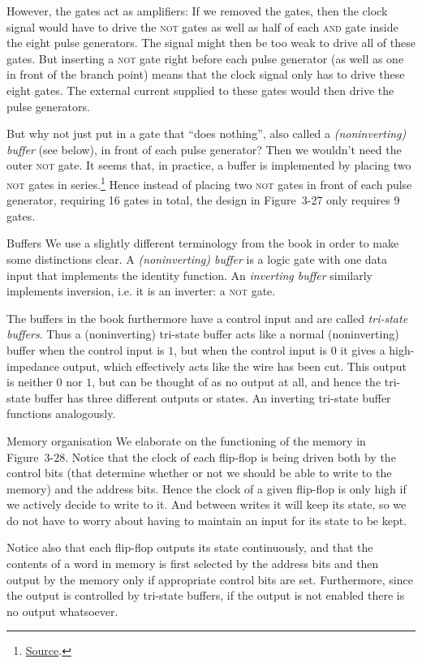 \documentclass[article, a4paper, 11pt, oneside]{memoir}
\numberwithin{equation}{chapter}
\newcommand{\gate}{\textsc}
\newcommand{\gateNOT}{\gate{not}}
\newcommand{\gateAND}{\gate{and}}
\begin{document}
\begin{notelist}
However, the gates act as amplifiers: If we removed the gates, then the clock signal would have to drive the \gateNOT{} gates as well as half of each \gateAND{} gate inside the eight pulse generators. The signal might then be too weak to drive all of these gates. But inserting a \gateNOT{} gate right before each pulse generator (as well as one in front of the branch point) means that the clock signal only has to drive these eight gates. The external current supplied to these gates would then drive the pulse generators.

But why not just put in a gate that \enquote{does nothing}, also called a \emph{(noninverting) buffer} (see below), in front of each pulse generator? Then we wouldn't need the outer \gateNOT{} gate. It seems that, in practice, a buffer is implemented by placing two \gateNOT{} gates in series.\footnote{ \href{https://link.springer.com/chapter/10.1007/978-1-4614-1323-3_2}{Source}.} Hence instead of placing two \gateNOT{} gates in front of each pulse generator, requiring 16 gates in total, the design in Figure~3-27 only requires 9 gates.

\item[Buffers]
We use a slightly different terminology from the book in order to make some distinctions clear. A \emph{(noninverting) buffer} is a logic gate with one data input that implements the identity function. An \emph{inverting buffer} similarly implements inversion, i.e. it is an inverter: a \gateNOT{} gate.

The buffers in the book furthermore have a control input and are called \emph{tri-state buffers}. Thus a (noninverting) tri-state buffer acts like a normal (noninverting) buffer when the control input is $1$, but when the control input is $0$ it gives a high-impedance output, which effectively acts like the wire has been cut. This output is neither $0$ nor $1$, but can be thought of as no output at all, and hence the tri-state buffer has three different outputs or states. An inverting tri-state buffer functions analogously.

\item[Memory organisation]
We elaborate on the functioning of the memory in Figure~3-28. Notice that the clock of each flip-flop is being driven both by the control bits (that determine whether or not we should be able to write to the memory) and the address bits. Hence the clock of a given flip-flop is only high if we actively decide to write to it. And between writes it will keep its state, so we do not have to worry about having to maintain an input for its state to be kept.

Notice also that each flip-flop outputs its state continuously, and that the contents of a word in memory is first selected by the address bits and then output by the memory only if appropriate control bits are set. Furthermore, since the output is controlled by tri-state buffers, if the output is not enabled there is no output whatsoever.
\end{notelist}
\end{document}
